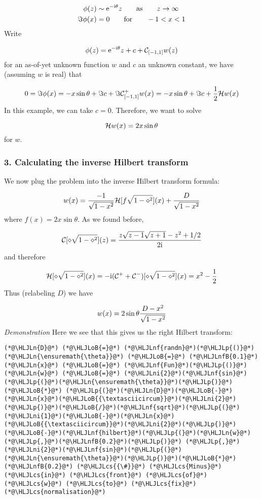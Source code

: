 \documentclass[12pt,a4paper]{article}
\newcommand{\HLJLn}[1]{#1}
\newcommand{\HLJLnf}[1]{\textcolor[RGB]{66,102,213}{#1}}
\newcommand{\HLJLnfB}[1]{\textcolor[RGB]{59,151,46}{#1}}
\newcommand{\HLJLni}[1]{\textcolor[RGB]{59,151,46}{#1}}
\newcommand{\HLJLoB}[1]{\textcolor[RGB]{102,102,102}{\textbf{#1}}}
\newcommand{\HLJLp}[1]{#1}
\newcommand{\HLJLcs}[1]{\textcolor[RGB]{153,153,119}{\textit{#1}}}
\def\I{ {\rm i} }
\def\E{ {\rm e} }
\def\CC{ {\cal C} }
\def\HH{ {\cal H} }
\begin{document}
\begin{align*}
    \phi(z) &\sim \E^{-\I \theta} z \qquad\hbox{as}\qquad z \to \infty \\
    \Im \phi(x) &= 0  \qquad\hbox{for}\qquad -1 < x < 1
\end{align*}
Write

\[
\phi(z) = \E^{-\I \theta} z + c + \CC_{[-1,1]} w(z)
\]
for an as-of-yet unknown function $w$ and $c$ an unknown constant, we have (assuming $w$ is real) that

\[
0 = \Im \phi(x) = -x \sin \theta + \Im c + \Im \CC_{[-1,1]}^+ w(x) = -x \sin \theta + \Im c +{1 \over 2} \HH w(x)
\]
In this example, we can take $c = 0$. Therefore, we want to solve

\[
\HH w(x) =  2 x  \sin \theta
\]
for $w$.

\subsubsection{3. Calculating the inverse Hilbert transform}
We now plug the problem into the inverse Hilbert transform formula:

\[
    w(x) = {- 1\over \sqrt{1-x^2}} {\cal H}[f \sqrt{1-\diamond^2}](x)  + {D \over \sqrt{1-x^2}}
\]
where $f(x) = 2 x \sin \theta$. As we found before,

\[
{\cal C}[\diamond \sqrt{1-\diamond^2}](z) = {z \sqrt{z-1} \sqrt{z+1} - z^2 + 1/2 \over 2 \I }
\]
and therefore

\[
{\cal H}[\diamond \sqrt{1-\diamond^2}](x) = -\I({\cal C}^+ + {\cal C}^-)[\diamond \sqrt{1-\diamond^2}](x) = x^2 - {1 \over 2}
\]
Thus (relabeling $D$) we have

\[
w(x) = 2\sin \theta {D - x^2 \over \sqrt{1-x^2}}
\]
\emph{Demonstration} Here we see that this gives us the right Hilbert transform:


\begin{lstlisting}
(*@\HLJLn{D}@*) (*@\HLJLoB{=}@*) (*@\HLJLnf{randn}@*)(*@\HLJLp{()}@*)
(*@\HLJLn{\ensuremath{\theta}}@*) (*@\HLJLoB{=}@*) (*@\HLJLnfB{0.1}@*)
(*@\HLJLn{x}@*) (*@\HLJLoB{=}@*) (*@\HLJLnf{Fun}@*)(*@\HLJLp{()}@*)
(*@\HLJLn{w}@*) (*@\HLJLoB{=}@*) (*@\HLJLni{2}@*)(*@\HLJLnf{sin}@*)(*@\HLJLp{(}@*)(*@\HLJLn{\ensuremath{\theta}}@*)(*@\HLJLp{)}@*) (*@\HLJLoB{*}@*) (*@\HLJLp{(}@*)(*@\HLJLn{D}@*)(*@\HLJLoB{-}@*)(*@\HLJLn{x}@*)(*@\HLJLoB{{\textasciicircum}}@*)(*@\HLJLni{2}@*)(*@\HLJLp{)}@*)(*@\HLJLoB{/}@*)(*@\HLJLnf{sqrt}@*)(*@\HLJLp{(}@*)(*@\HLJLni{1}@*)(*@\HLJLoB{-}@*)(*@\HLJLn{x}@*)(*@\HLJLoB{{\textasciicircum}}@*)(*@\HLJLni{2}@*)(*@\HLJLp{)}@*)
(*@\HLJLoB{-}@*)(*@\HLJLnf{hilbert}@*)(*@\HLJLp{(}@*)(*@\HLJLn{w}@*)(*@\HLJLp{,}@*)(*@\HLJLnfB{0.2}@*)(*@\HLJLp{)}@*) (*@\HLJLp{,}@*) (*@\HLJLni{2}@*)(*@\HLJLnf{sin}@*)(*@\HLJLp{(}@*)(*@\HLJLn{\ensuremath{\theta}}@*)(*@\HLJLp{)}@*)(*@\HLJLoB{*}@*)(*@\HLJLnfB{0.2}@*) (*@\HLJLcs{{\#}}@*) (*@\HLJLcs{Minus}@*) (*@\HLJLcs{in}@*) (*@\HLJLcs{front}@*) (*@\HLJLcs{of}@*) (*@\HLJLcs{w}@*) (*@\HLJLcs{to}@*) (*@\HLJLcs{fix}@*) (*@\HLJLcs{normalisation}@*)
\end{lstlisting}
\end{document}
